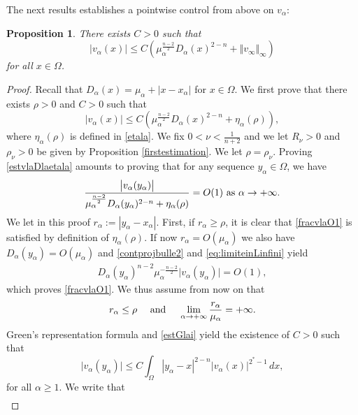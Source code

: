 \documentclass[10pt]{amsart}
\numberwithin{equation}{section}
\newcommand{\Om}{\Omega}
\newcommand{\ma}{\mu_\alpha}
\def \bb{\hbox}
\def \vv {\mathbb{\Vert}}
\def \xl{x_\alpha}
\def \ls{+\infty}
\def\la{\alpha}
\def \ma{\mu_{\alpha}}
\def \yl{y_{\alpha}}
\def \va{v_{\alpha}}
\def \vo {v_{\infty}}
\def \ro{\rho}
\theoremstyle{plain}
\newtheorem{prop}{Proposition}[section]%
\theoremstyle{remark}
\begin{document}
The next results establishes a pointwise control from above on $\va$:

\begin{prop}\label{est3vla}
There exists $C>0$ such that 
\begin{equation}\label{est5vla}
\big|v_{\la}(x)\big|\leq C \left(  \ma^{\frac{n-2}{2}}D_{\la}(x)^{2-n}+\vv \vo \vv_{\infty}\right)
\end{equation}
for all $x\in \Om$.
\end{prop}


\begin{proof}
Recall that $D_{\la}(x)=\ma +|x-\xl|$ for $x \in \Om$. We first prove that there exists $\ro>0$ and $C>0$ such that 
\begin{equation}\label{estvlaDlaetala}
|v_{\la}(x)|\leq C\left( \ma^{\frac{n-2}{2}}D_{\la}(x)^{2-n}+\eta_{\la}(\rho)\right),
\end{equation}
where  $\eta_{\la}(\ro)$ is defined in \eqref{etala}. We fix $0<\nu <\frac{1}{n+2}$ and we let $R_{\nu}>0$ and $\ro_{\nu}>0$ be given by Proposition  \ref{firstestimation}. We let $\rho = \rho_\nu$. Proving \eqref{estvlaDlaetala} amounts to proving that for any sequence $\yl\in \Om$, we have
\begin{equation}\label{fracvlaO1}
\frac{\big|v_{\la}(\yl)\big|}{\ma^{\frac{n-2}{2}}D_{\la}(\yl)^{2-n}+\eta_{\la}(\ro)}=O(1) \bb{ as } \la \to \ls.
\end{equation}
We let in this proof $r_{\la}:=|\yl-\xl|$. First, if  $r_{\la}\geq \ro$, it  is clear that \eqref{fracvlaO1} is satisfied by definition of $\eta_{\la}(\ro)$. If now $r_\la=O(\ma)$ we also have $D_\la(\yl)=O(\ma)$ and \eqref{contprojbulle2} and \eqref{eq:limiteinLinfini} yield
\begin{eqnarray*}
	D_{\la}(\yl)^{n-2}\ma^{-\frac{n-2}{2}}\big|v_\la(\yl)\big|=O(1),
\end{eqnarray*}
which proves \eqref{fracvlaO1}. We thus assume from now on that 
\begin{equation}\label{case2}
r_{\la}\leq \ro \quad \bb{ and } \quad \lim_{\la\to\ls}\frac{r_{\la}}{\ma}=+\infty.
\end{equation}
 Green's representation formula and \eqref{estGlai} yield the existence of $C>0$ such that
\begin{equation} \label{est4vla}
\big|v_{\la}(\yl)\big| 
\leq C \int_{\Om} |\yl-x|^{2-n} \big|v_{\la}(x)\big|^{2^*-1}\, dx,
\end{equation}
for all $\alpha \ge 1$. We write that
\begin{eqnarray}\label{est4vla1}

\end{eqnarray}
\end{proof}
\end{document}
